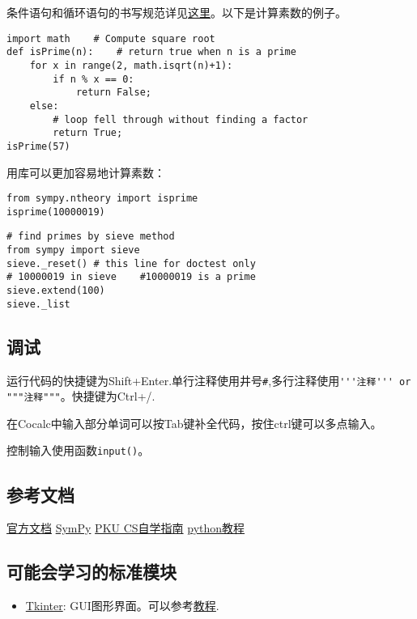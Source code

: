 \documentclass[11pt]{amsart}
\begin{document}
条件语句和循环语句的书写规范详见\href{https://docs.python.org/3/tutorial/controlflow.html}{这里}。以下是计算素数的例子。
\begin{lstlisting}[language=iPython]
import math    # Compute square root
def isPrime(n):    # return true when n is a prime
    for x in range(2, math.isqrt(n)+1):
        if n % x == 0:
            return False;
    else:
        # loop fell through without finding a factor
        return True;
isPrime(57)
\end{lstlisting}
用库可以更加容易地计算素数：
\begin{lstlisting}[language=iPython]
from sympy.ntheory import isprime
isprime(10000019)
\end{lstlisting}
\begin{lstlisting}[language=iPython]
# find primes by sieve method
from sympy import sieve
sieve._reset() # this line for doctest only
# 10000019 in sieve    #10000019 is a prime
sieve.extend(100)
sieve._list
\end{lstlisting}
\subsection{调试}
运行代码的快捷键为Shift+Enter.单行注释使用井号\lstinline|#|,多行注释使用\lstinline|'''注释''' or """注释"""|。快捷键为Ctrl+/.

在Cocalc中输入部分单词可以按Tab键补全代码，按住ctrl键可以多点输入。

控制输入使用函数\lstinline|input()|。

\subsection{参考文档}
\href{https://docs.python.org/zh-cn/3/tutorial/index.html}{官方文档}
\href{https://docs.sympy.org/latest/tutorial/index.html#tutorial}{SymPy}
\href{https://csdiy.wiki/}{PKU CS自学指南}
\href{https://www.pythontutorial.net/}{python教程}
\subsection{可能会学习的标准模块}
\begin{itemize}
\item \href{https://docs.python.org/3/library/tkinter.html}{Tkinter}: GUI图形界面。可以参考\href{https://www.pythontutorial.net/tkinter/}{教程}.
\end{itemize}
\end{document}
